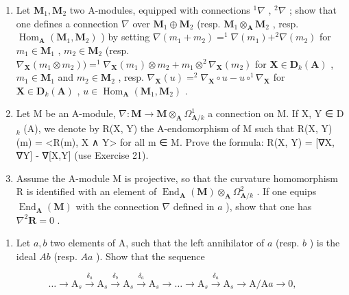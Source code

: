 \begin{enumerate}
\def\labelenumi{\alph{enumi})}
\item
  Let \(\mathbf{M}_1, \mathbf{M}_2\) two A-modules, equipped with connections \(^1\nabla\) , \(^2\nabla\) ; show that one defines a connection \(\nabla\) over \(\mathbf{M}_1 \oplus \mathbf{M}_2\) (resp. \(\mathbf{M}_1 \otimes_{\mathbf{A}} \mathbf{M}_2\) , resp. \(\operatorname{Hom}_{\mathbf{A}}(\mathbf{M}_1, \mathbf{M}_2)\) ) by setting \(\nabla(m_1 + m_2) = ^1\nabla(m_1) + ^2\nabla(m_2)\) for \(m_1 \in \mathbf{M}_1\) , \(m_2 \in \mathbf{M}_2\) (resp. \(\nabla_{\mathbf{X}}(m_1 \otimes m_2)) = ^1\nabla_{\mathbf{X}}(m_1) \otimes m_2 + m_1 \otimes ^2\nabla_{\mathbf{X}}(m_2)\) for \(\mathbf{X} \in \mathbf{D}_k(\mathbf{A})\) , \(m_1 \in \mathbf{M}_1\) and \(m_2 \in \mathbf{M}_2\) , resp. \(\nabla_{\mathbf{X}}(u) = ^2\nabla_{\mathbf{X}} \circ u - u \circ ^1\nabla_{\mathbf{X}}\) for \(\mathbf{X} \in \mathbf{D}_k(\mathbf{A})\) , \(u \in \operatorname{Hom}_{\mathbf{A}}(\mathbf{M}_1, \mathbf{M}_2)\) .
\item
  Let M be an A-module, \(\nabla: \mathbf{M} \to \mathbf{M} \otimes_{\mathbf{A}} \Omega_{\mathbf{A}/k}^{1}\) a connection on M. If X, Y ∈ D \(_{k}\) (A), we denote by R(X, Y) the A-endomorphism of M such that R(X, Y)(m) = \textless R(m), X ∧ Y\textgreater{} for all m ∈ M. Prove the formula: R(X, Y) = {[}∇X, ∇Y{]} - ∇{[}X,Y{]} (use Exercise 21).
\item
  Assume the A-module M is projective, so that the curvature homomorphism R is identified with an element of \(\operatorname{End}_{\mathbf{A}}(\mathbf{M}) \otimes_{\mathbf{A}} \Omega_{\mathbf{A}/k}^{2}\) . If one equips \(\operatorname{End}_{\mathbf{A}}(\mathbf{M})\) with the connection \(\nabla\) defined in \(a\) ), show that one has \(\nabla^{2}\mathbf{R} = 0\) .
\end{enumerate}


\begin{enumerate}
\def\labelenumi{\arabic{enumi})}
\tightlist
\item
  Let \(a, b\) two elements of A, such that the left annihilator of \(a\) (resp. \(b\) ) is the ideal \(Ab\) (resp. \(Aa\) ). Show that the sequence
\end{enumerate}

\[
\dots \longrightarrow \mathrm{A} _ {s} \xrightarrow {\delta_ {a}} \mathrm{A} _ {s} \xrightarrow {\delta_ {b}} \mathrm{A} _ {s} \xrightarrow {\delta_ {a}} \mathrm{A} _ {s} \longrightarrow \dots \longrightarrow \mathrm{A} _ {s} \xrightarrow {\delta_ {a}} \mathrm{A} _ {s} \longrightarrow \mathrm{A} / \mathrm{A} a \longrightarrow 0,
\]


